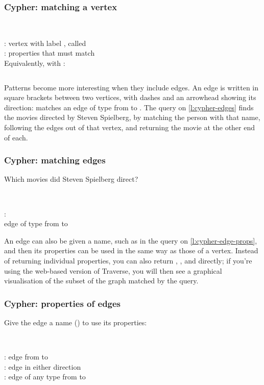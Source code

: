 \begin{frame}
    \label{s:cypher-match}
    \frametitle{Cypher: matching a vertex}
    \inputminted[fontsize=\footnotesize]{cypher}{code/graph-match.cypher}
    \vspace{0.3em}
    {\footnotesize}\\[0.8em]
    : vertex with label , called \\
    : properties that must match\\[0.8em]\pause
    Equivalently, with :
    \inputminted[fontsize=\footnotesize]{cypher}{code/graph-where.cypher}
\end{frame}
\label{l:cypher-match}

Patterns become more interesting when they include edges.
An edge is written in square brackets between two vertices, with dashes and an arrowhead showing its direction:  matches an edge of type  from  to .
The query on \autoref{l:cypher-edges} finds the movies directed by Steven Spielberg, by matching the person with that name, following the  edges out of that vertex, and returning the movie at the other end of each.

\begin{frame}
    \label{s:cypher-edges}
    \frametitle{Cypher: matching edges}
    Which movies did Steven Spielberg direct?
    \inputminted[fontsize=\footnotesize]{cypher}{code/graph-directed.cypher}
    \vspace{0.3em}
    {\footnotesize}\\[0.8em]
    :\\
    edge of type  from  to 
\end{frame}
\label{l:cypher-edges}

An edge can also be given a name, such as  in the query on \autoref{l:cypher-edge-props}, and then its properties can be used in the same way as those of a vertex.
Instead of returning individual properties, you can also return , , and  directly; if you're using the web-based version of Traverse, you will then see a graphical visualisation of the subset of the graph matched by the query.

\begin{frame}
    \label{s:cypher-edge-props}
    \frametitle{Cypher: properties of edges}
    Give the edge a name () to use its properties:
    \inputminted[fontsize=\footnotesize]{cypher}{code/graph-roles.cypher}
    \vspace{0.3em}
    {\footnotesize}\\[0.8em]\pause
    : edge from  to \\
    : edge in either direction\\
    : edge of any type from  to 
\end{frame}
\label{l:cypher-edge-props}

